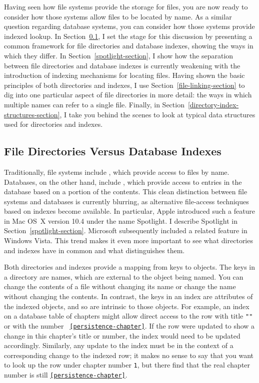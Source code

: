 Having seen how file systems provide the storage for files, you are now ready to
consider how those
systems allow files to be located by name.  As a similar question regarding
database systems, you can consider how those systems provide indexed lookup.  In
Section~\ref{directory-index-comparison-section}, I set the stage for
this discussion by presenting a common framework for file directories
and database indexes, showing the ways in which they differ.
In Section~\ref{spotlight-section}, I show how the separation
between file directories and database indexes is currently weakening
with the introduction of indexing mechanisms for locating files.
Having shown the basic principles of both directories and indexes, I use
Section~\ref{file-linking-section} to dig into one particular aspect of
file directories in more detail: the ways in which multiple names can
refer to a single file.  Finally, in
Section~\ref{directory-index-structures-section}, I take you behind
the scenes to look at typical data structures used for directories and indexes.

\subsection{File Directories Versus Database Indexes}\label{directory-index-comparison-section}

Traditionally, file systems include , which provide access
to files by name.  Databases, on the other hand, include ,
which provide access to entries in the database based on a portion of
the contents.  This clean distinction between file systems and
databases is currently blurring, as alternative file-access techniques
based on indexes become available.  In particular, Apple introduced
such a feature in Mac OS~X version 10.4 under the name Spotlight.  I
describe Spotlight in Section~\ref{spotlight-section}.  Microsoft
subsequently included a related feature in
Windows Vista.  This trend makes it even more
important to see what directories and indexes have in common and what
distinguishes them.

Both directories and indexes provide a mapping from keys to objects.
The keys in a directory are names, which are external to the object
being named.  You can change the contents of a file without changing
its name or change the name without changing the contents.  In
contrast, the keys in an index are attributes of the indexed objects,
and so are intrinsic to those objects.  For example, an index on a
database table of chapters might allow direct access to the row with
title {\tt "\persistenceChapterTitle"} or with the number {\tt
\ref{persistence-chapter}}.  If the row were updated to show a change
in this chapter's title or number, the index would need to be updated
accordingly.  Similarly, any update to the index must be in the context of
a corresponding change to
the indexed row; it makes no sense to say that you want
to look up the row under chapter number {\tt 1}, but there find that
the real chapter number is still {\tt \ref{persistence-chapter}}.

